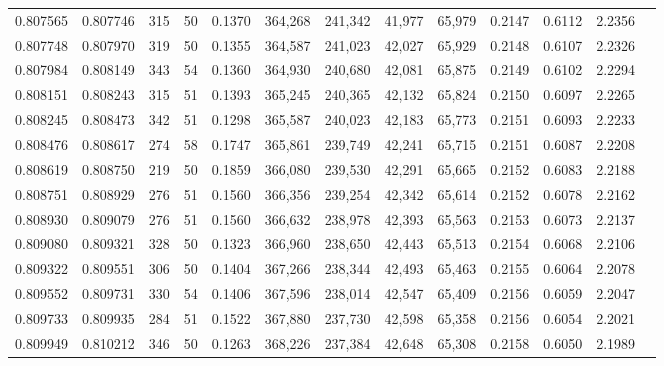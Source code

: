 \begin{tabular}{rrrrrrrrrrrrr}
0.807565 & 0.807746 &   315 &  50 &                                     0.1370 & 364,268 & 241,342 &  41,977 &  65,979 & 0.2147 & 0.6112 & 2.2356 \\
0.807748 & 0.807970 &   319 &  50 &                                     0.1355 & 364,587 & 241,023 &  42,027 &  65,929 & 0.2148 & 0.6107 & 2.2326 \\
0.807984 & 0.808149 &   343 &  54 &                                     0.1360 & 364,930 & 240,680 &  42,081 &  65,875 & 0.2149 & 0.6102 & 2.2294 \\
0.808151 & 0.808243 &   315 &  51 &                                     0.1393 & 365,245 & 240,365 &  42,132 &  65,824 & 0.2150 & 0.6097 & 2.2265 \\
0.808245 & 0.808473 &   342 &  51 &                                     0.1298 & 365,587 & 240,023 &  42,183 &  65,773 & 0.2151 & 0.6093 & 2.2233 \\
0.808476 & 0.808617 &   274 &  58 &                                     0.1747 & 365,861 & 239,749 &  42,241 &  65,715 & 0.2151 & 0.6087 & 2.2208 \\
0.808619 & 0.808750 &   219 &  50 &                                     0.1859 & 366,080 & 239,530 &  42,291 &  65,665 & 0.2152 & 0.6083 & 2.2188 \\
0.808751 & 0.808929 &   276 &  51 &                                     0.1560 & 366,356 & 239,254 &  42,342 &  65,614 & 0.2152 & 0.6078 & 2.2162 \\
0.808930 & 0.809079 &   276 &  51 &                                     0.1560 & 366,632 & 238,978 &  42,393 &  65,563 & 0.2153 & 0.6073 & 2.2137 \\
0.809080 & 0.809321 &   328 &  50 &                                     0.1323 & 366,960 & 238,650 &  42,443 &  65,513 & 0.2154 & 0.6068 & 2.2106 \\
0.809322 & 0.809551 &   306 &  50 &                                     0.1404 & 367,266 & 238,344 &  42,493 &  65,463 & 0.2155 & 0.6064 & 2.2078 \\
0.809552 & 0.809731 &   330 &  54 &                                     0.1406 & 367,596 & 238,014 &  42,547 &  65,409 & 0.2156 & 0.6059 & 2.2047 \\
0.809733 & 0.809935 &   284 &  51 &                                     0.1522 & 367,880 & 237,730 &  42,598 &  65,358 & 0.2156 & 0.6054 & 2.2021 \\
0.809949 & 0.810212 &   346 &  50 &                                     0.1263 & 368,226 & 237,384 &  42,648 &  65,308 & 0.2158 & 0.6050 & 2.1989 \\

\end{tabular}
